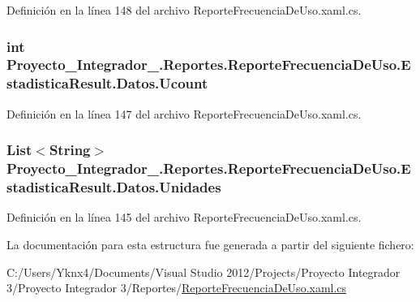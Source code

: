 Definición en la línea 148 del archivo Reporte\-Frecuencia\-De\-Uso.\-xaml.\-cs.

\hypertarget{struct_proyecto___integrador__3_1_1_reportes_1_1_reporte_frecuencia_de_uso_1_1_estadistica_result_1_1_datos_a7651dc7d0f1617da0643e61950bdb90f}{
\subsubsection[{Ucount}]{\setlength{\rightskip}{0pt plus 5cm}int Proyecto\-\_\-\-Integrador\-\_.\-Reportes.\-Reporte\-Frecuencia\-De\-Uso.\-Estadistica\-Result.\-Datos.\-Ucount}}\label{struct_proyecto___integrador__3_1_1_reportes_1_1_reporte_frecuencia_de_uso_1_1_estadistica_result_1_1_datos_a7651dc7d0f1617da0643e61950bdb90f}


Definición en la línea 147 del archivo Reporte\-Frecuencia\-De\-Uso.\-xaml.\-cs.

\hypertarget{struct_proyecto___integrador__3_1_1_reportes_1_1_reporte_frecuencia_de_uso_1_1_estadistica_result_1_1_datos_a81df80256c122959ba9bb1870d9085a5}{
\subsubsection[{Unidades}]{\setlength{\rightskip}{0pt plus 5cm}List$<$String$>$ Proyecto\-\_\-\-Integrador\-\_.\-Reportes.\-Reporte\-Frecuencia\-De\-Uso.\-Estadistica\-Result.\-Datos.\-Unidades}}\label{struct_proyecto___integrador__3_1_1_reportes_1_1_reporte_frecuencia_de_uso_1_1_estadistica_result_1_1_datos_a81df80256c122959ba9bb1870d9085a5}


Definición en la línea 145 del archivo Reporte\-Frecuencia\-De\-Uso.\-xaml.\-cs.



La documentación para esta estructura fue generada a partir del siguiente fichero\-:\begin{DoxyCompactItemize}
\item 
C\-:/\-Users/\-Yknx4/\-Documents/\-Visual Studio 2012/\-Projects/\-Proyecto Integrador 3/\-Proyecto Integrador 3/\-Reportes/\hyperlink{_reporte_frecuencia_de_uso_8xaml_8cs}{Reporte\-Frecuencia\-De\-Uso.\-xaml.\-cs}\end{DoxyCompactItemize}
